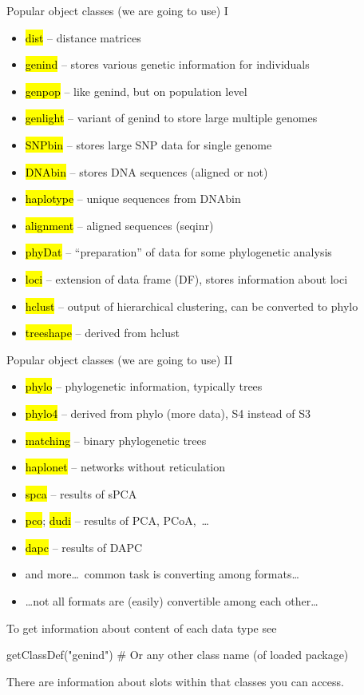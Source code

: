 \documentclass[compress, ucs, xelatex, 11pt, xcolor=svgnames,
  hyperref={
    bookmarks=true,
    unicode=true,
    colorlinks=true,
    pdftitle={Molecular data in R},
    plainpages=false,
    pdfauthor={Vojtech Zeisek},
    pdfsubject={Course about phylogeny and evolution in R},
    pdfcreator={XeLaTeX},
    pdfkeywords={R, evolution, phylogeny, molecular data},
    linkcolor=Tomato,
    anchorcolor=SaddleBrown,
    citecolor=Goldenrod,
    filecolor=DarkMagenta,
    menucolor=Sienna,
    urlcolor=DarkTurquoise,
    pdftex},
  url={hyphens, lowtilde} %
  ]{beamer}
\renewcommand{\texttt}[1]{\hl{\ttfamily #1}}
\begin{document}
\begin{frame}{Popular object classes (we are going to use) I} %
  \begin{itemize}
    \item \texttt{dist} -- distance matrices
    \item \texttt{genind} -- stores various genetic information for individuals
    \item \texttt{genpop} -- like genind, but on population level
    \item \texttt{genlight} -- variant of genind to store large multiple genomes
    \item \texttt{SNPbin} -- stores large SNP data for single genome
    \item \texttt{DNAbin} -- stores DNA sequences (aligned or not)
    \item \texttt{haplotype} -- unique sequences from DNAbin
    \item \texttt{alignment} -- aligned sequences (seqinr)
    \item \texttt{phyDat} -- ``preparation'' of data for some phylogenetic analysis
    \item \texttt{loci} -- extension of data frame (DF), stores information about loci
    \item \texttt{hclust} -- output of hierarchical clustering, can be converted to phylo
    \item \texttt{treeshape} -- derived from hclust
  \end{itemize}
\end{frame}

\begin{frame}[fragile]{Popular object classes (we are going to use) II}
  \begin{itemize}
    \item \texttt{phylo} -- phylogenetic information, typically trees
    \item \texttt{phylo4} -- derived from phylo (more data), S4 instead of S3
    \item \texttt{matching} -- binary phylogenetic trees
    \item \texttt{haplonet} -- networks without reticulation
    \item \texttt{spca} -- results of sPCA
    \item \texttt{pco}; \texttt{dudi} -- results of PCA, PCoA,~\ldots
    \item \texttt{dapc} -- results of DAPC
    \item and more\ldots~common task is converting among formats\ldots
    \item \ldots not all formats are (easily) convertible among each other\ldots
  \end{itemize}
  To get information about content of each data type see
  \begin{spluscode}
    getClassDef("genind") # Or any other class name (of loaded package)
  \end{spluscode}
  There are information about slots within that classes you can access.
\end{frame}
\end{document}
